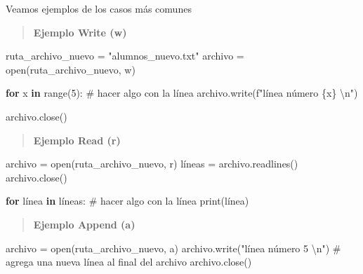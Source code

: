 \documentclass[
  letterpaper,
  DIV=11,
  numbers=noendperiod]{scrreprt}
\newenvironment{Shaded}{\begin{snugshade}}{\end{snugshade}}
\newcommand{\BuiltInTok}[1]{\textcolor[rgb]{0.00,0.23,0.31}{#1}}
\newcommand{\CharTok}[1]{\textcolor[rgb]{0.13,0.47,0.30}{#1}}
\newcommand{\CommentTok}[1]{\textcolor[rgb]{0.37,0.37,0.37}{#1}}
\newcommand{\ControlFlowTok}[1]{\textcolor[rgb]{0.00,0.23,0.31}{\textbf{#1}}}
\newcommand{\DecValTok}[1]{\textcolor[rgb]{0.68,0.00,0.00}{#1}}
\newcommand{\KeywordTok}[1]{\textcolor[rgb]{0.00,0.23,0.31}{\textbf{#1}}}
\newcommand{\NormalTok}[1]{\textcolor[rgb]{0.00,0.23,0.31}{#1}}
\newcommand{\OperatorTok}[1]{\textcolor[rgb]{0.37,0.37,0.37}{#1}}
\newcommand{\SpecialCharTok}[1]{\textcolor[rgb]{0.37,0.37,0.37}{#1}}
\newcommand{\SpecialStringTok}[1]{\textcolor[rgb]{0.13,0.47,0.30}{#1}}
\newcommand{\StringTok}[1]{\textcolor[rgb]{0.13,0.47,0.30}{#1}}
\begin{document}
Veamos ejemplos de los casos más comunes

\begin{quote}
\textbf{Ejemplo Write (w)}
\end{quote}

\begin{Shaded}
\begin{Highlighting}[]
\NormalTok{ruta\_archivo\_nuevo }\OperatorTok{=} \StringTok{"alumnos\_nuevo.txt"}
\NormalTok{archivo }\OperatorTok{=} \BuiltInTok{open}\NormalTok{(ruta\_archivo\_nuevo, }\StringTok{\textquotesingle{}w\textquotesingle{}}\NormalTok{)}

\ControlFlowTok{for}\NormalTok{ x }\KeywordTok{in} \BuiltInTok{range}\NormalTok{(}\DecValTok{5}\NormalTok{):}
  \CommentTok{\# hacer algo con la línea}
\NormalTok{  archivo.write(}\SpecialStringTok{f"línea número }\SpecialCharTok{\{}\NormalTok{x}\SpecialCharTok{\}}\SpecialStringTok{ }\CharTok{\textbackslash{}n}\SpecialStringTok{"}\NormalTok{)}

\NormalTok{archivo.close()}
\end{Highlighting}
\end{Shaded}

\begin{quote}
\textbf{Ejemplo Read (r)}
\end{quote}

\begin{Shaded}
\begin{Highlighting}[]
\NormalTok{archivo }\OperatorTok{=} \BuiltInTok{open}\NormalTok{(ruta\_archivo\_nuevo, }\StringTok{\textquotesingle{}r\textquotesingle{}}\NormalTok{)}
\NormalTok{líneas }\OperatorTok{=}\NormalTok{ archivo.readlines()}
\NormalTok{archivo.close()}

\ControlFlowTok{for}\NormalTok{ línea }\KeywordTok{in}\NormalTok{ líneas:}
  \CommentTok{\# hacer algo con la línea}
  \BuiltInTok{print}\NormalTok{(línea)}
\end{Highlighting}
\end{Shaded}

\begin{quote}
\textbf{Ejemplo Append (a)}
\end{quote}

\begin{Shaded}
\begin{Highlighting}[]
\NormalTok{archivo }\OperatorTok{=} \BuiltInTok{open}\NormalTok{(ruta\_archivo\_nuevo, }\StringTok{\textquotesingle{}a\textquotesingle{}}\NormalTok{)}
\NormalTok{archivo.write(}\StringTok{"línea número 5 }\CharTok{\textbackslash{}n}\StringTok{"}\NormalTok{) }\CommentTok{\# agrega una nueva línea al final del archivo}
\NormalTok{archivo.close()}
\end{Highlighting}
\end{Shaded}
\end{document}
